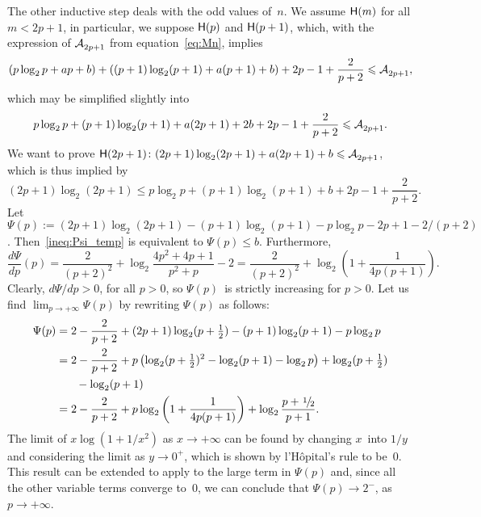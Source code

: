 The other inductive step deals with the odd values of~\(n\). We assume
\(\textsf{H}({m})\) for all \(m < 2p+1\), in particular, we suppose
\(\textsf{H}({p})\) and \(\textsf{H}({p+1})\), which, with the expression of
\(\mathcal{A}_{2p+1}^{}\) from equation~\eqref{eq:Mn}, implies
\begin{equation*}
(p\log_2 p + ap + b) + ((p+1)\log_2(p+1) + a(p+1) + b) + 2p - 1 +
\frac{2}{p+2} \leqslant \mathcal{A}_{2p+1}^{},
\end{equation*} 
which may be simplified slightly into
\begin{equation*}
p\log_2 p + (p+1)\log_2(p+1) + a(2p+1) + 2b + 2p - 1 + \frac{2}{p+2}
\leqslant \mathcal{A}_{2p+1}^{}.
\end{equation*} 
We want to prove \(\textsf{H}({2p+1}) \colon (2p+1)\log_2(2p+1) +
a(2p+1) + b \leqslant \mathcal{A}_{2p+1}^{}\), which is thus implied by 
\begin{equation}
  (2p+1)\log_2(2p+1) \leqslant
  p\log_2 p + (p+1)\log_2(p+1) + b + 2p - 1 + \frac{2}{p+2}.
\label{ineq:Psi_temp}
\end{equation} 
Let \(\Psi(p) := (2p+1)\log_2(2p+1) - (p+1)\log_2(p+1) - p\log_2 p -
2p + 1 - 2/(p+2)\). Then~\eqref{ineq:Psi_temp} is equivalent to
\(\Psi(p) \leqslant b\). Furthermore,
\begin{equation*}
\frac{d\Psi}{dp}(p) = \frac{2}{(p+2)^2} 
+ \log_2\frac{4p^2 + 4p + 1}{p^2 + p} - 2
= \frac{2}{(p+2)^2} + \log_2\left(1+\frac{1}{4p(p+1)}\right).
\end{equation*}
Clearly, \(d\Psi/dp > 0\), for all \(p > 0\), so \(\Psi(p)\)~is
strictly increasing for \(p > 0\). Let us find \(\lim_{p \to
  +\infty}\Psi(p)\) by rewriting \(\Psi(p)\) as follows:
\begin{align*}
\Psi(p)
  &= 2 - \frac{2}{p+2} + (2p+1)\log_2(p+\tfrac{1}{2}) - (p+1)\log_2(p+1)
     - p\log_2 p\\
  &= 2 - \frac{2}{p+2} + p\left(\log_2(p+\tfrac{1}{2})^2 - \log_2(p+1)
   - \log_2 p\right) + \log_2(p+\tfrac{1}{2})\\
  &\phantom{=} \quad - \log_2(p+1)\\
  &= 2 - \frac{2}{p+2} + p\log_2\left(1 + \frac{1}{4p(p+1)}\right) +
  \log_2\frac{p + \myfrac{1}/{2}}{p+1}.
\end{align*}
The limit of \(x\log(1+1/x^2)\) as \(x \to +\infty\) can be found by
changing \(x\)~into \(1/y\) and considering the limit as \(y \to
0^{+}\), which is shown by l'H\^{o}pital's rule to be~\(0\). This
result can be extended to apply to the large term in \(\Psi(p)\) and,
since all the other variable terms converge to~\(0\), we can conclude
that \(\Psi(p) \to 2^{-}\), as \(p \to +\infty\).

